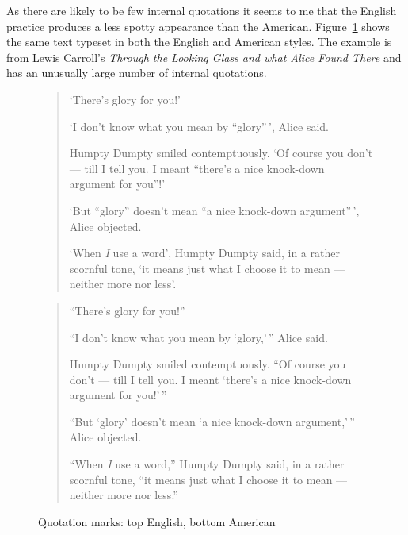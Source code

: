 \documentclass[10pt,letterpaper,extrafontsizes]{memoir}
\begin{document}
    As there are likely to be few internal quotations 
it seems to me that
the English practice produces a less spotty appearance than the American.
Figure~\ref{fig:qmarks} shows the same text typeset in both the English
and American styles. The example is from Lewis Carroll's 
\emph{Through the Looking Glass and what Alice Found There} 
and has an unusually large number of internal quotations. 

\begin{figure}
\centering
\begin{minipage}{\textwidth}
\mbox{}\hrulefill\mbox{}
\begin{quotation}
    `There's glory for you!' 

    `I don't know what you mean by ``glory''\,', Alice said. 

    Humpty Dumpty smiled contemptuously. `Of course you don't --- till I tell
you. I meant ``there's a nice knock-down argument for you''!' 

    `But ``glory'' doesn't mean ``a nice knock-down argument''\,', Alice
objected. 

    `When \emph{I} use a word', Humpty Dumpty said, in a rather scornful
tone, `it means just what I choose it to mean --- neither more nor less'.
\end{quotation}
\mbox{}\hrulefill\mbox{}
\begin{quotation}
     ``There's glory for you!'' 

    ``I don't know what you mean by `glory,'\,'' Alice said. 

    Humpty Dumpty smiled contemptuously. ``Of course you don't --- till I tell
you. I meant `there's a nice knock-down argument for you!'\,'' 

    ``But `glory' doesn't mean `a nice knock-down argument,'\,'' Alice
objected. 

    ``When \emph{I} use a word,'' Humpty Dumpty said, in a rather scornful
tone, ``it means just what I choose it to mean --- neither more nor less.''
\end{quotation}
\mbox{}\hrulefill\mbox{}
\end{minipage}
\caption{Quotation marks: top English, bottom American}\label{fig:qmarks}
\end{figure}
\end{document}
